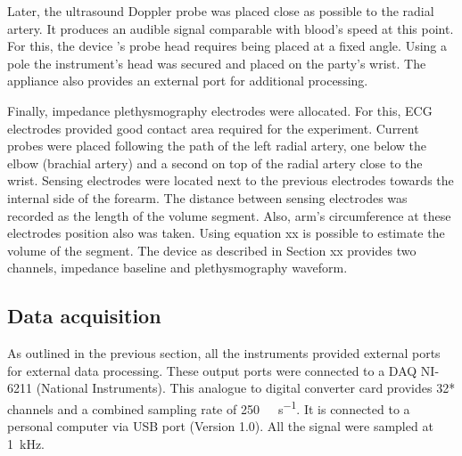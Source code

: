 

Later, the ultrasound Doppler probe was placed close as possible to the radial artery. It produces an audible signal comparable with blood's speed at this point. For this, the device 's probe head requires being placed at a fixed angle. Using a pole the instrument's head was secured and placed on the party's wrist. The appliance also provides an external port for additional processing.  



Finally, impedance plethysmography electrodes were allocated. For this, ECG electrodes provided good contact area required for the experiment. Current probes were placed following the path of the left radial artery, one below the elbow (brachial artery) and a second on top of the radial artery close to the wrist. Sensing electrodes were located next to the previous electrodes towards the internal side of the forearm. The distance between sensing electrodes was recorded as the length of the volume segment. Also, arm's circumference at these electrodes position also was taken. Using equation xx is possible to estimate the volume of the segment.  The device as described in Section xx provides two channels, impedance baseline and plethysmography waveform. 



\subsection{Data acquisition}

\label{section4.1.2}

As outlined in the previous section, all the instruments provided external ports for external data processing. These output ports were connected to a DAQ NI-6211 (National Instruments). This analogue to digital converter card provides 32* channels and a combined sampling rate of \SI{250}{\kilo\sample\per\second}. It is connected to a personal computer via USB port (Version 1.0). All the signal were sampled at \SI{1}{\kilo\hertz}.

